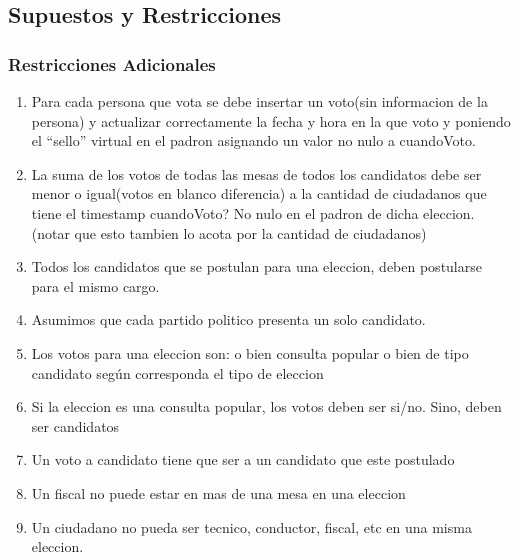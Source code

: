 \subsection{Supuestos y Restricciones}

\subsubsection{Restricciones Adicionales}

\begin{enumerate}
	\item  Para cada persona que vota se debe insertar un voto(sin informacion de la persona) y actualizar correctamente la fecha y hora en la que voto y poniendo el “sello” virtual en el padron asignando un valor no nulo a cuandoVoto.
	\item  La suma de los votos de todas las mesas de todos los candidatos debe ser menor o igual(votos en blanco diferencia) a la cantidad de ciudadanos que tiene el timestamp cuandoVoto? No nulo en el padron de dicha eleccion. (notar que esto tambien lo acota por la cantidad de ciudadanos)
	\item  Todos los candidatos que se postulan para una eleccion, deben postularse para el mismo cargo.
	\item  Asumimos que cada partido politico presenta un solo candidato.
	\item  Los votos para una eleccion son: o bien consulta popular o bien de tipo candidato según corresponda el tipo de eleccion
	\item Si la eleccion es una consulta popular, los votos deben ser si/no. Sino, deben ser candidatos
	\item Un voto a candidato tiene que ser a un candidato que este postulado
	\item  Un fiscal no puede estar en mas de una mesa en una eleccion
	\item Un ciudadano no pueda ser tecnico, conductor, fiscal, etc en una misma eleccion.
\end{enumerate}
